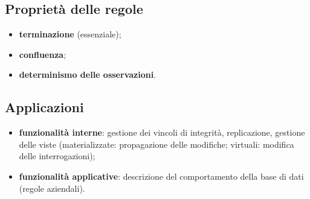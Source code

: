 \documentclass[a4paper,12pt]{article}
\begin{document}
\subsection{Proprietà delle regole}

\begin{itemize}
  \item \textbf{terminazione} (essenziale);
  \item \textbf{confluenza};
  \item \textbf{determinismo delle osservazioni}.
\end{itemize}

\subsection{Applicazioni}

\begin{itemize}
  \item \textbf{funzionalità interne}: gestione dei vincoli di integrità,
    replicazione, gestione delle viste (materializzate: propagazione delle
    modifiche; virtuali: modifica delle interrogazioni);
  \item \textbf{funzionalità applicative}: descrizione del comportamento
    della base di dati (regole aziendali).
\end{itemize}
\end{document}
